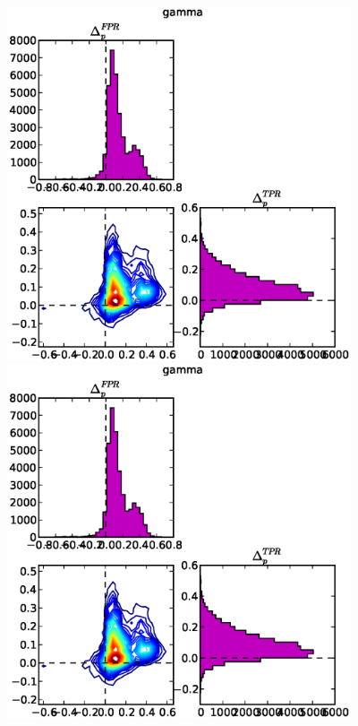 \begin{figure}[!h]
\begin{center}
\includegraphics[width=4in]{../fig/final/delta_hist/gamma}
\includegraphics[width=4in]{../fig/final/delta_hist/gamma}
\end{center}
\caption{\label{fig:deltas1}}
\end{figure}

